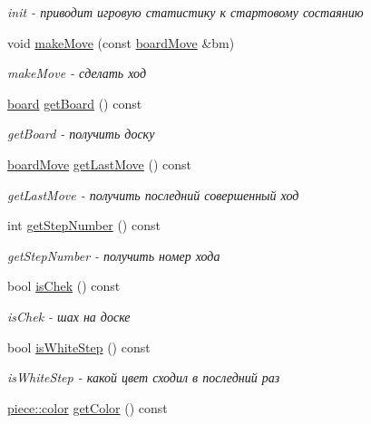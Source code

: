 \begin{DoxyCompactItemize}
\begin{DoxyCompactList}\small\item\em init -\/ приводит игровую статистику к стартовому состаянию \end{DoxyCompactList}\item 
void \hyperlink{classchess_game_state_a259cdc59bd56b6e9737d7d904a044cdd}{make\+Move} (const \hyperlink{classboard_move}{board\+Move} \&bm)
\begin{DoxyCompactList}\small\item\em make\+Move -\/ сделать ход \end{DoxyCompactList}\item 
\hyperlink{classboard}{board} \hyperlink{classchess_game_state_a711c3cf730b86934e2a194d34c0c5e16}{get\+Board} () const 
\begin{DoxyCompactList}\small\item\em get\+Board -\/ получить доску \end{DoxyCompactList}\item 
\hyperlink{classboard_move}{board\+Move} \hyperlink{classchess_game_state_af5b0dd9ad83beea6da4c951e0d09af03}{get\+Last\+Move} () const 
\begin{DoxyCompactList}\small\item\em get\+Last\+Move -\/ получить последний совершенный ход \end{DoxyCompactList}\item 
int \hyperlink{classchess_game_state_a49be350f4b7e8a10dab2ceff8753f529}{get\+Step\+Number} () const 
\begin{DoxyCompactList}\small\item\em get\+Step\+Number -\/ получить номер хода \end{DoxyCompactList}\item 
bool \hyperlink{classchess_game_state_a29925a54a671e3bb3bd51d1a87eb00ed}{is\+Chek} () const 
\begin{DoxyCompactList}\small\item\em is\+Chek -\/ шах на доске \end{DoxyCompactList}\item 
bool \hyperlink{classchess_game_state_a70098682d6f3a2cad6b2ac1832ae99c2}{is\+White\+Step} () const 
\begin{DoxyCompactList}\small\item\em is\+White\+Step -\/ какой цвет сходил в последний раз \end{DoxyCompactList}\item 
\hyperlink{classpiece_a0e121e5952345fd0e7014a8e6a1fbbda}{piece\+::color} \hyperlink{classchess_game_state_ab5011f008dbf3c7bc991a17edc4ceac1}{get\+Color} () const 

\end{DoxyCompactItemize}
